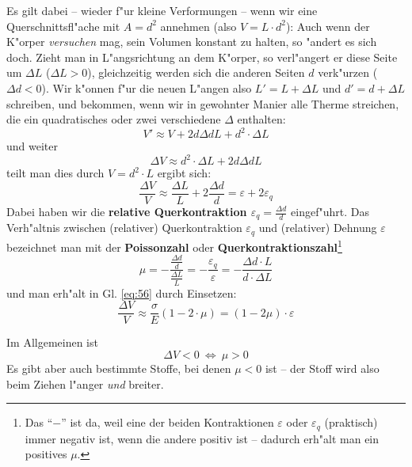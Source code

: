 Es gilt dabei -- wieder f"ur kleine Verformungen -- wenn wir eine
Querschnittsfl"ache mit $A = d^2$ annehmen (also $V = L\cdot d^2$):
Auch wenn der K"orper \emph{versuchen} mag, sein Volumen konstant zu
halten, so "andert es sich doch. Zieht man in L"angsrichtung an dem
K"orper, so verl"angert er diese Seite um $\Delta L$ ($\Delta L > 0$),
gleichzeitig werden sich die anderen Seiten $d$ verk"urzen ($\Delta d <
0$). Wir k"onnen f"ur die neuen L"angen also $L' = L + \Delta L$ und $d'
= d + \Delta L$ schreiben, und bekommen,
wenn wir in gewohnter Manier alle Therme streichen, die ein
quadratisches oder zwei verschiedene $\Delta$  enthalten:
$$
V' \approx V + 2d\Delta d L + d^2 \cdot \Delta L
$$
und weiter
$$
\Delta V \approx  d^2 \cdot \Delta L + 2d\Delta d L
$$
teilt man dies durch $V = d^2 \cdot L$ ergibt sich:
\begin{equation}
   \label{eq:56}
   \frac{\Delta V}{V} \approx \frac{\Delta L}{L} + 2 \frac{\Delta
     d}{d} = \varepsilon + 2 \varepsilon_q
\end{equation}
Dabei haben wir die \textbf{relative
  Querkontraktion $\varepsilon_q = \frac{\Delta
    d}{d}$} eingef"uhrt.  Das Verh"altnis zwischen (relativer)
Querkontraktion $\varepsilon_q$ und (relativer) Dehnung $\varepsilon$
bezeichnet man mit der \textbf{Poissonzahl} oder
\textbf{Querkontraktionszahl}\footnote{Das
  "`$-$"' ist da, weil eine der beiden Kontraktionen $\varepsilon$
  oder $\varepsilon_q$ (praktisch) immer negativ ist, wenn die andere
  positiv ist -- dadurch erh"alt man ein positives $\mu$.}
\begin{equation}
   \label{eqn_def_poissonzahl}
   \mu = - \frac{\frac{\Delta d}{d}}{\frac{\Delta L}{L}} =
- \frac{\varepsilon_q}{\varepsilon} =
-   \frac{\Delta d \cdot L}{d \cdot \Delta L}
\end{equation}
und man erh"alt in Gl. \eqref{eq:56} durch Einsetzen:
\begin{equation}
   \label{eq:57}
   \boxed{\frac{\Delta V}{V} \approx \frac{\sigma}{E} ( 1 - 2\cdot \mu) }= (1
   - 2\mu) \cdot \varepsilon
\end{equation}


Im Allgemeinen ist 
$$
\Delta V < 0 ~ \Leftrightarrow ~ \mu > 0
$$
Es gibt aber auch bestimmte Stoffe, bei denen $\mu < 0$ ist -- der
Stoff wird also beim Ziehen l"anger \emph{und} breiter.




